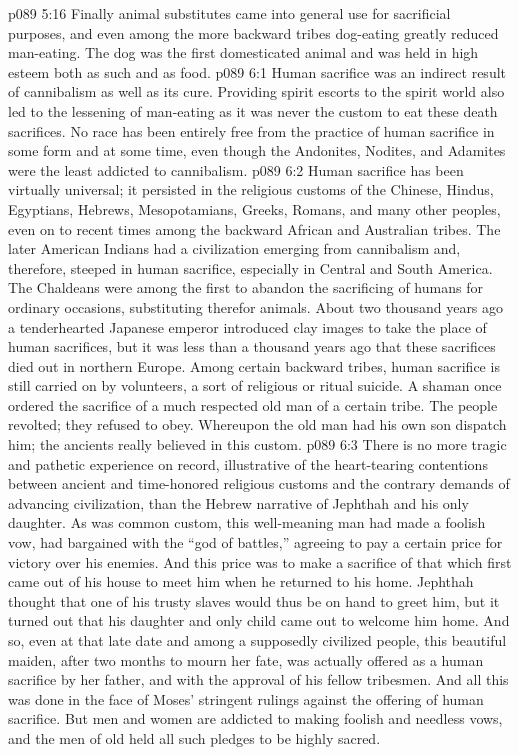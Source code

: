 \vs p089 5:16 \pc Finally animal substitutes came into general use for sacrificial purposes, and even among the more backward tribes dog\hyp{}eating greatly reduced man\hyp{}eating. The dog was the first domesticated animal and was held in high esteem both as such and as food.
\vs p089 6:1 Human sacrifice was an indirect result of cannibalism as well as its cure. Providing spirit escorts to the spirit world also led to the lessening of man\hyp{}eating as it was never the custom to eat these death sacrifices. No race has been entirely free from the practice of human sacrifice in some form and at some time, even though the Andonites, Nodites, and Adamites were the least addicted to cannibalism.
\vs p089 6:2 Human sacrifice has been virtually universal; it persisted in the religious customs of the Chinese, Hindus, Egyptians, Hebrews, Mesopotamians, Greeks, Romans, and many other peoples, even on to recent times among the backward African and Australian tribes. The later American Indians had a civilization emerging from cannibalism and, therefore, steeped in human sacrifice, especially in Central and South America. The Chaldeans were among the first to abandon the sacrificing of humans for ordinary occasions, substituting therefor animals. About two thousand years ago a tenderhearted Japanese emperor introduced clay images to take the place of human sacrifices, but it was less than a thousand years ago that these sacrifices died out in northern Europe. Among certain backward tribes, human sacrifice is still carried on by volunteers, a sort of religious or ritual suicide. A shaman once ordered the sacrifice of a much respected old man of a certain tribe. The people revolted; they refused to obey. Whereupon the old man had his own son dispatch him; the ancients really believed in this custom.
\vs p089 6:3 \pc There is no more tragic and pathetic experience on record, illustrative of the heart\hyp{}tearing contentions between ancient and time\hyp{}honored religious customs and the contrary demands of advancing civilization, than the Hebrew narrative of Jephthah and his only daughter. As was common custom, this well\hyp{}meaning man had made a foolish vow, had bargained with the “god of battles,” agreeing to pay a certain price for victory over his enemies. And this price was to make a sacrifice of that which first came out of his house to meet him when he returned to his home. Jephthah thought that one of his trusty slaves would thus be on hand to greet him, but it turned out that his daughter and only child came out to welcome him home. And so, even at that late date and among a supposedly civilized people, this beautiful maiden, after two months to mourn her fate, was actually offered as a human sacrifice by her father, and with the approval of his fellow tribesmen. And all this was done in the face of Moses’ stringent rulings against the offering of human sacrifice. But men and women are addicted to making foolish and needless vows, and the men of old held all such pledges to be highly sacred.
